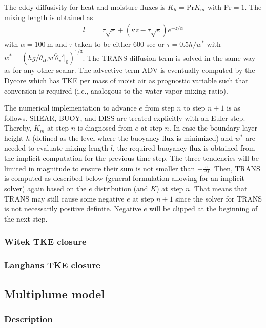 \documentclass[dvipdfmx,a4paper,10pt]{article}
\begin{document}
The eddy diffusivity for heat and moisture fluxes is $K_h=\mathrm{Pr} K_m$ with $\mathrm{Pr}=1$. The mixing length is obtained as
\begin{eqnarray}
 l &=& \tau \sqrt{e} + (\kappa z - \tau \sqrt{e}) e^{-z/\alpha}
\end{eqnarray}
with $\alpha=100\mathrm{~m}$ and $\tau$ taken to be either 600 sec or $\tau=0.5 h/w^*$ with $w^*=(hg/\theta_{v0} \overline{w'\theta_v'}|_0)^{1/3}$. 
The TRANS diffusion term is solved in the same way as for any other scalar. The advective term ADV is eventually computed by the Dycore which has TKE per mass of moist air as prognostic variable such that conversion is required (i.e., analogous to the water vapor mixing ratio). 

The numerical implementation to advance $e$ from step $n$ to step $n+1$ is as follows. SHEAR, BUOY, and DISS are treated explicitly with an Euler step. Thereby, $K_m$ at step $n$ is diagnosed from $e$ at step $n$. In case the boundary layer height $h$ (defined as the level where the buoyancy flux is minimized) and $w^*$ are needed to evaluate mixing length $l$, the required buoyancy flux is obtained from the implicit computation for the previous time step. The three tendencies will be limited in magnitude to ensure their sum is not smaller than $-\frac{e}{\Delta t}$. Then, TRANS is computed as described below (general formulation allowing for an implicit solver) again based on the $e$ distribution (and $K$) at step $n$. That means that TRANS may still cause some negative $e$ at step $n+1$ since the solver for TRANS is not necessarily positive definite. Negative $e$ will be clipped at the beginning of the next step.

\subsubsection{Witek TKE closure}

\subsubsection{Langhans TKE closure}

\subsection{Multiplume model}

\subsubsection{Description}
\end{document}
